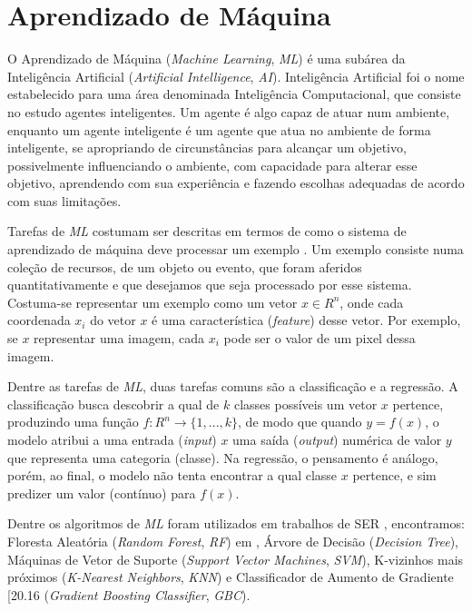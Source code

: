 \section{Aprendizado de Máquina}

O Aprendizado de Máquina (\textit{Machine Learning}, \textit{ML}) é uma subárea da Inteligência Artificial (\textit{Artificial Intelligence}, \textit{AI}). Inteligência Artificial foi o nome estabelecido \cite{12.23} para uma área denominada Inteligência Computacional, que consiste no estudo agentes inteligentes. Um agente é algo capaz de atuar num ambiente, enquanto um agente inteligente é um agente que atua no ambiente de forma inteligente, se apropriando de circunstâncias para alcançar um objetivo, possivelmente influenciando o ambiente, com capacidade para alterar esse objetivo, aprendendo com sua experiência e fazendo escolhas adequadas de acordo com suas limitações.

Tarefas de \textit{ML} costumam ser descritas em termos de como o sistema de aprendizado de máquina deve processar um exemplo \cite{53}. Um exemplo consiste numa coleção de recursos, de um objeto ou evento, que foram aferidos quantitativamente e que desejamos que seja processado por esse sistema. Costuma-se representar um exemplo como um vetor $x \in R^n$, onde cada coordenada $x_i$ do vetor $x$ é uma característica (\textit{feature}) desse vetor. Por exemplo, se $x$ representar uma imagem, cada $x_i$ pode ser o valor de um pixel dessa imagem.

Dentre as tarefas de \textit{ML}, duas tarefas comuns são a classificação e a regressão. A classificação busca descobrir a qual de $k$ classes possíveis um vetor $x$ pertence, produzindo uma função $f: R^n \rightarrow \{1, ..., k\}$, de modo que quando $y = f(x)$, o modelo atribui a uma entrada (\textit{input}) $x$ uma saída (\textit{output}) numérica de valor $y$ que representa uma categoria (classe). Na regressão, o pensamento é análogo, porém, ao final, o modelo não tenta encontrar a qual classe $x$ pertence, e sim predizer um valor (contínuo) para $f(x)$.

Dentre os algoritmos de \textit{ML} foram utilizados em trabalhos de SER \cite{20.7}, encontramos: Floresta Aleatória (\textit{Random Forest}, \textit{RF}) em \cite{20.10}, Árvore de Decisão \cite{20.11} (\textit{Decision Tree}), Máquinas de Vetor de Suporte \cite{20.13} (\textit{Support Vector Machines}, \textit{SVM}), K-vizinhos mais próximos \cite{20.15} (\textit{K-Nearest Neighbors}, \textit{KNN}) e Classificador de Aumento de Gradiente [20.16 (\textit{Gradient Boosting Classifier}, \textit{GBC}).

